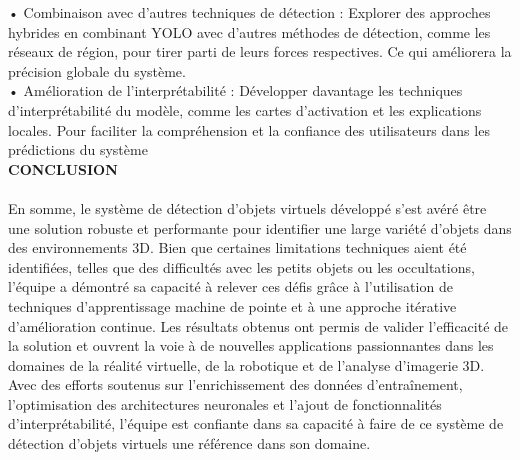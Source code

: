 \documentclass[a4paper, 13px]{article}
\begin{document}
•	Combinaison avec d'autres techniques de détection : Explorer des approches hybrides en combinant YOLO avec d'autres méthodes de détection, comme les réseaux de région, pour tirer parti de leurs forces respectives. Ce qui améliorera la précision globale du système.\\

•	Amélioration de l'interprétabilité : Développer davantage les techniques d'interprétabilité du modèle, comme les cartes d'activation et les explications locales. Pour faciliter la compréhension et la confiance des utilisateurs dans les prédictions du système\\



{\bfseries \MakeUppercase{Conclusion}}\\
\\
En somme, le système de détection d'objets virtuels développé s'est avéré être une solution robuste et performante pour identifier une large variété d'objets dans des environnements 3D. Bien que certaines limitations techniques aient été identifiées, telles que des difficultés avec les petits objets ou les occultations, l'équipe a démontré sa capacité à relever ces défis grâce à l'utilisation de techniques d'apprentissage machine de pointe et à une approche itérative d'amélioration continue. Les résultats obtenus ont permis de valider l'efficacité de la solution et ouvrent la voie à de nouvelles applications passionnantes dans les domaines de la réalité virtuelle, de la robotique et de l'analyse d'imagerie 3D. Avec des efforts soutenus sur l'enrichissement des données d'entraînement, l'optimisation des architectures neuronales et l'ajout de fonctionnalités d'interprétabilité, l'équipe est confiante dans sa capacité à faire de ce système de détection d'objets virtuels une référence dans son domaine.
\end{document}
